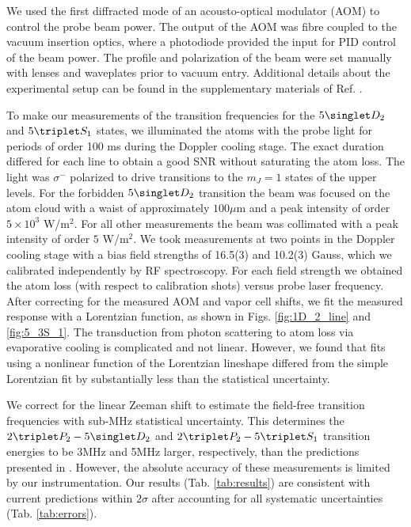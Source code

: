 We used the first diffracted mode of an acousto-optical modulator (AOM) to control the probe beam power.
	The output of the AOM was fibre coupled to the vacuum insertion optics, where a photodiode provided the input for PID control of the beam power.
	The profile and polarization of the beam were set manually with lenses and waveplates prior to vacuum entry.
	Additional details about the experimental setup can be found in the supplementary materials of Ref.
	\cite{Thomas20}.


To make our measurements of the transition frequencies for the $5\singlet D_2$ and $5\triplet S_1$ states, we illuminated the atoms with the probe light for periods of order 100 ms during the Doppler cooling stage.
	The exact duration differed for each line to obtain a good SNR without saturating the atom loss.
	The light was $\sigma^-$ polarized to drive transitions to the $m_J=1$ states of the upper levels.
	For the forbidden $5\singlet D_2$ transition the beam was focused on the atom cloud with a waist of approximately $100\mu$m and a peak intensity of order $5\times 10^3$ W/m$^2$.
	For all other measurements the beam was collimated with a peak intensity of order $ 5$ W/m$^2$.
	We took measurements at two points in the Doppler cooling stage with a bias field strengths of {16.5(3)} and {10.2(3)} Gauss, which we calibrated independently by RF spectroscopy.
	For each field strength we obtained the atom loss (with respect to calibration shots) versus probe laser frequency.
	After correcting for the measured AOM and vapor cell shifts, we fit the measured response with a Lorentzian function, as shown in Figs.
	\ref{fig:1D_2_line} and \ref{fig:5_3S_1}.
	{The transduction from photon scattering to atom loss via evaporative cooling is complicated and not linear.
	However, we found that fits using a nonlinear function of the Lorentzian lineshape differed from the simple Lorentzian fit by substantially less than the statistical uncertainty.}

We correct for the linear Zeeman shift to estimate the field-free transition frequencies with sub-MHz statistical uncertainty.
	This determines the $2\triplet P_2-5\singlet D_2$ and $2\triplet P_2-5\triplet S_1$ transition energies to be 3MHz and 5MHz larger, respectively, than the predictions presented in \cite{Drake07}.
	However, the absolute accuracy of these measurements is limited by our instrumentation.
	Our results (Tab.
	\ref{tab:results}) are consistent with current predictions \cite{Drake07} within $2\sigma$ after accounting for all systematic uncertainties (Tab.
	\ref{tab:errors}).

